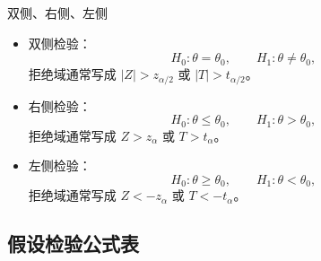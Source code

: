 \documentclass[UTF8,zihao=-4,fontset=fandol]{ctexart}
\begin{document}
\begin{keybox}{双侧、右侧、左侧}
\begin{itemize}
  \item 双侧检验：
  \[
  H_0:\theta=\theta_0,\qquad H_1:\theta\ne\theta_0,
  \]
  拒绝域通常写成 $|Z|>z_{\alpha/2}$ 或 $|T|>t_{\alpha/2}$。
  \item 右侧检验：
  \[
  H_0:\theta\le \theta_0,\qquad H_1:\theta>\theta_0,
  \]
  拒绝域通常写成 $Z>z_{\alpha}$ 或 $T>t_{\alpha}$。
  \item 左侧检验：
  \[
  H_0:\theta\ge \theta_0,\qquad H_1:\theta<\theta_0,
  \]
  拒绝域通常写成 $Z<-z_{\alpha}$ 或 $T<-t_{\alpha}$。
\end{itemize}
\end{keybox}

\subsection{假设检验公式表}
\end{document}
